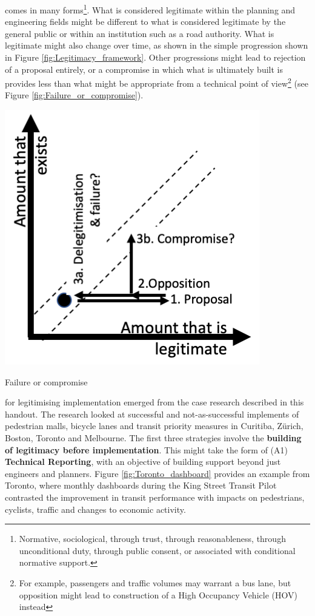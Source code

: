 \documentclass{tufte-handout}
\begin{document}
 comes in many forms\footnote{Normative, sociological, through trust, through reasonableness, through unconditional duty, through public consent, or associated with conditional normative support.}. What is considered legitimate within the planning and engineering fields might be different to what is considered legitimate by the general public or within an institution such as a road authority. What is legitimate might also change over time, as shown in the simple progression shown in Figure \ref{fig:Legitimacy_framework}. Other progressions might lead to rejection of a proposal entirely, or a compromise in which what is ultimately built is provides less than what might be appropriate from a technical point of view\footnote{For example, passengers and traffic volumes may warrant a bus lane, but opposition might lead to construction of a High Occupancy Vehicle (HOV) instead} (see Figure \ref{fig:Failure_or_compromise}).


\begin{marginfigure}%
  \includegraphics[width=\linewidth]{Failure_or_compromise}
  \caption{Failure or compromise}
  \label{fig:Failure_or_compromise}
\end{marginfigure}




 for legitimising implementation emerged from the case research described in this handout. The research looked at successful and not-as-successful implements of pedestrian malls, bicycle lanes and transit priority measures in Curitiba, Zürich, Boston, Toronto and Melbourne.  The first three strategies involve the \textbf{building of legitimacy before implementation}. This might take the form of (A1) \textbf{Technical Reporting}, with an objective of building support beyond just engineers and planners. Figure \ref{fig:Toronto_dashboard} provides an example from Toronto, where monthly dashboards during the King Street Transit Pilot contrasted the improvement in transit performance with impacts on pedestrians, cyclists, traffic and changes to economic activity. 
\end{document}
